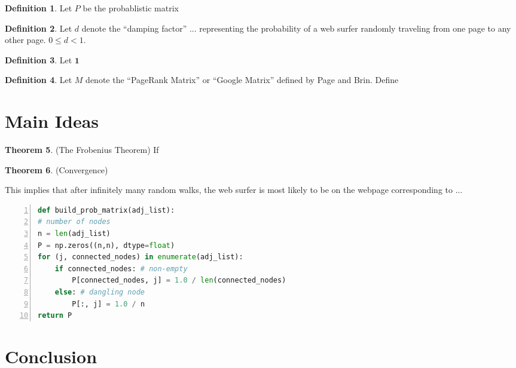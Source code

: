 \documentclass[11pt]{article}
\theoremstyle{definition}
\newtheorem{theorem}{Theorem}
\newtheorem{definition}[theorem]{Definition}
\renewcommand{\vec}[1]{\mathbf{#1}}
\begin{document}
\begin{definition}
    Let $P$ be the probablistic matrix 
\end{definition}

\begin{definition}
    Let $d$ denote the ``damping factor'' ... representing the probability of a web surfer randomly traveling from one page to any other page. $0 \leq d < 1$.
\end{definition}

\begin{definition}
    Let $\vec{1}$ 
\end{definition}

\begin{definition}
    Let $M$ denote the ``PageRank Matrix'' or ``Google Matrix'' defined by Page and Brin.
    Define 
\end{definition}


\section{Main Ideas}

\begin{theorem}
    (The Frobenius Theorem) If 
\end{theorem}

\begin{theorem}
    (Convergence) 
\end{theorem}

This implies that after infinitely many random walks, the web surfer is most likely to be on the webpage corresponding to ...

\begin{lstlisting}[language=python, basicstyle={\small\ttfamily}, numbers=left]
def build_prob_matrix(adj_list):
# number of nodes
n = len(adj_list)
P = np.zeros((n,n), dtype=float)
for (j, connected_nodes) in enumerate(adj_list):
    if connected_nodes: # non-empty
        P[connected_nodes, j] = 1.0 / len(connected_nodes)
    else: # dangling node
        P[:, j] = 1.0 / n
return P
\end{lstlisting}


\section{Conclusion}

\begin{thebibliography}{9}
\bibitem{}

\end{thebibliography}
\end{document}
